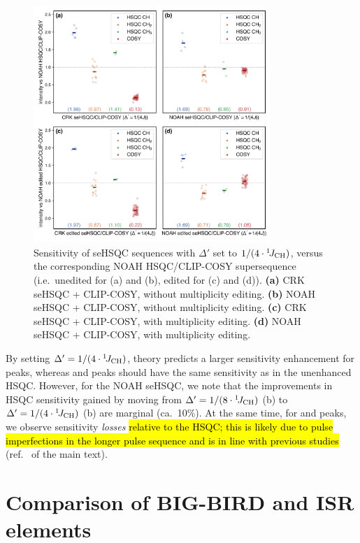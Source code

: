 \begin{figure}
    \centering
    \includegraphics[width=0.8\textwidth]{./figures/combined_1_4j.png}
    \caption{
        Sensitivity of seHSQC sequences with $\Delta'$ set to $1/(4\cdot\onejch)$, versus the corresponding NOAH HSQC/CLIP-COSY supersequence (i.e.\ unedited for (a) and (b), edited for (c) and (d)).
        \textbf{(a)} CRK seHSQC + CLIP-COSY, without multiplicity editing.
        \textbf{(b)} NOAH seHSQC + CLIP-COSY, without multiplicity editing.
        \textbf{(c)} CRK seHSQC + CLIP-COSY, with multiplicity editing.
        \textbf{(d)} NOAH seHSQC + CLIP-COSY, with multiplicity editing.
        \andro{}
    }
    \label{fig:combined_1_4j}
\end{figure}

By setting $\Delta' = 1/(4\cdot\onejch)$, theory predicts a larger sensitivity enhancement for  peaks, whereas  and  peaks should have the same sensitivity as in the unenhanced HSQC.
However, for the NOAH seHSQC, we note that the improvements in HSQC  sensitivity gained by moving from $\Delta' = 1/(8\cdot\onejch)$ (b) to $\Delta' = 1/(4\cdot\onejch)$ (b) are marginal (ca.\ 10\%).
At the same time, for  and  peaks, we observe sensitivity \textit{losses} \hl{relative to the HSQC; this is likely due to pulse imperfections in the longer pulse sequence and is in line with previous studies} (ref.\  of the main text).

\section{Comparison of BIG-BIRD and ISR elements}

